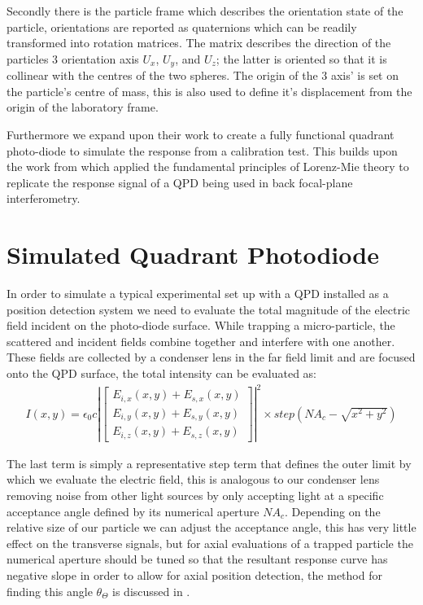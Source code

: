 Secondly there is the particle frame which describes the orientation state of 
the particle, orientations are reported as quaternions which can be readily 
transformed into rotation matrices. The matrix describes the direction of the 
particles 3 orientation axis $U_x$, $U_y$, and $U_z$; the latter is oriented 
so that it is collinear with the centres of the two spheres. The origin of 
the 3 axis' is set on the particle's centre of mass, this is also used to 
define it's displacement from the origin of the laboratory frame. 



Furthermore we expand upon their work to create a fully functional quadrant 
photo-diode to simulate the response from a calibration test. This builds 
upon the work from \cite{Rohrbach2002} which applied the fundamental 
principles of Lorenz-Mie theory to replicate the response signal of a QPD 
being used in back focal-plane interferometry.

\section{Simulated Quadrant Photodiode}
\label{sec:simulated_QPD}
In order to simulate a typical experimental set up with a QPD installed 
as a position detection system we need to evaluate the total magnitude of 
the electric field incident on the photo-diode surface. While trapping a 
micro-particle, the scattered and incident fields combine together and 
interfere with one another. These fields are collected by a condenser 
lens in the far field limit and are focused onto the QPD surface, the 
total intensity can be evaluated as:
\begin{align}
I(x,y) = \epsilon_0c\left|
\begin{bmatrix} 
	E_{i,x}(x,y)+E_{s,x}(x,y) \\ 
	E_{i,y}(x,y)+E_{s,y}(x,y) \\ 
	E_{i,z}(x,y)+E_{s,z}(x,y)
\end{bmatrix} \right|^2 \times step(NA_c-\sqrt{x^2+y^2})
\end{align}

The last term is simply a representative step term that defines the outer 
limit by which we evaluate the electric field, this is analogous to our 
condenser lens removing noise from other light sources by only accepting 
light at a specific acceptance angle defined by its numerical aperture 
$NA_c$. Depending on the relative size of our particle we can adjust 
the acceptance angle, this has very little effect on the transverse 
signals, but for axial evaluations of a trapped particle the numerical 
aperture should be tuned so that the resultant response curve has negative 
slope in order to allow for axial position detection, the method for 
finding this angle $\theta_\Theta$ is discussed in \cite{Friedrich2012}.

